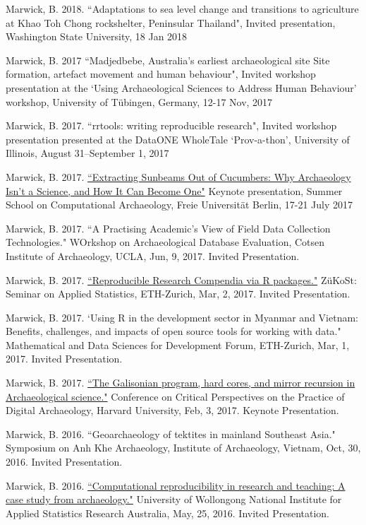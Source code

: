 \ind Marwick, B. 2018. ``Adaptations to sea level change and transitions to agriculture at Khao Toh Chong rockshelter, Peninsular Thailand", Invited presentation, Washington State University, 18 Jan 2018

\ind Marwick, B. 2017 ``Madjedbebe, Australia's earliest archaeological site Site formation, artefact movement and human behaviour", Invited workshop presentation at the ‘Using Archaeological Sciences to Address Human Behaviour’ workshop, University of Tübingen, Germany, 12-17 Nov, 2017

\ind Marwick, B. 2017. ``rrtools: writing reproducible research", Invited workshop presentation presented at the DataONE WholeTale ‘Prov-a-thon’, University of Illinois, August 31–September 1, 2017

\ind Marwick, B. 2017. \href{https://github.com/benmarwick/berlinsummerschoolkeynote}{``Extracting Sunbeams Out of Cucumbers: Why Archaeology Isn't a Science, and How It Can Become One"} Keynote presentation, Summer School on Computational Archaeology, Freie Universität Berlin, 17-21 July 2017

\ind Marwick, B. 2017. ``A Practising Academic’s View of Field Data Collection Technologies." WOrkshop on Archaeological Database Evaluation, Cotsen Institute of Archaeology, UCLA,  Jun, 9, 2017. Invited Presentation.

\ind Marwick, B. 2017. \href{https://github.com/benmarwick/ETH-Zurich-ZuKoSt-Reproducible-Research-Compendia-via-R-packages}{``Reproducible Research Compendia via R packages."} ZüKoSt: Seminar on Applied Statistics, ETH-Zurich,  Mar, 2, 2017. Invited Presentation.

\ind Marwick, B. 2017. `Using R in the development sector in Myanmar and Vietnam: Benefits, challenges, and impacts of open source tools for working with data." Mathematical and Data Sciences for Development Forum, ETH-Zurich,  Mar, 1, 2017. Invited Presentation.

\ind Marwick, B. 2017. \href{https://www.youtube.com/watch?v=k3Wv4Cnr0Nc}{``The Galisonian program, hard cores, and mirror recursion in Archaeological science."} Conference on Critical Perspectives on the Practice of Digital Archaeology, Harvard University,  Feb, 3, 2017. Keynote Presentation.

\ind Marwick, B. 2016. ``Geoarchaeology of tektites in mainland Southeast Asia." Symposium on Anh Khe Archaeology, Institute of Archaeology, Vietnam, Oct, 30, 2016. Invited Presentation.

\ind Marwick, B. 2016. \href{https://github.com/benmarwick/UOW-NIASRA-2016-talk}{``Computational reproducibility in research and teaching: A case study from archaeology."} University of Wollongong National Institute for Applied Statistics Research Australia, May, 25, 2016. Invited Presentation.

